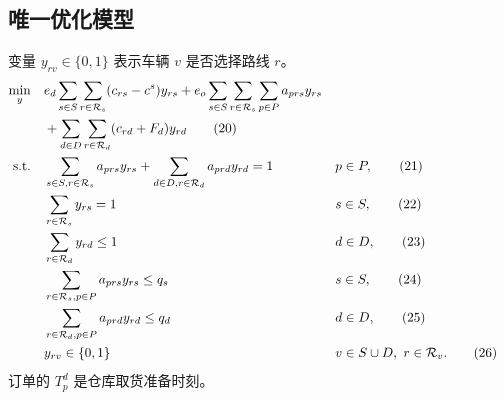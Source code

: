\documentclass[UTF8,11pt]{ctexart}
\begin{document}
\subsection*{唯一优化模型}
变量 $y_{rv}\in\{0,1\}$ 表示车辆 $v$ 是否选择路线 $r$。
\begin{align}
\min_y\quad&
 e_d\sum_{s\in S}\sum_{r\in\mathcal R_s}(c_{rs}-c^s)y_{rs}
 +e_o\sum_{s\in S}\sum_{r\in\mathcal R_s}\sum_{p\in P}a_{prs}y_{rs}\notag\\
&+\sum_{d\in D}\sum_{r\in\mathcal R_d}(c_{rd}+F_d)y_{rd}\tag{20}\\
\text{s.t.}\quad&
\sum_{s\in S,r\in\mathcal R_s}a_{prs}y_{rs}
+\sum_{d\in D,r\in\mathcal R_d}a_{prd}y_{rd}=1 &&p\in P,\tag{21}\\
&\sum_{r\in\mathcal R_s}y_{rs}=1 &&s\in S,\tag{22}\\
&\sum_{r\in\mathcal R_d}y_{rd}\le1 &&d\in D,\tag{23}\\
&\sum_{r\in\mathcal R_s,p\in P}a_{prs}y_{rs}\le q_s &&s\in S,\tag{24}\\
&\sum_{r\in\mathcal R_d,p\in P}a_{prd}y_{rd}\le q_d &&d\in D,\tag{25}\\
&y_{rv}\in\{0,1\} &&v\in S\cup D,\ r\in\mathcal R_v.\tag{26}
\end{align}
订单的 $T_p^d$ 是仓库取货准备时刻。
\end{document}
